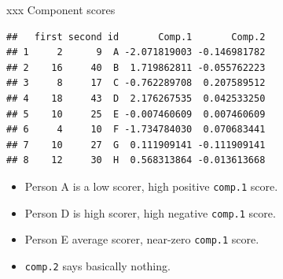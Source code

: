 \documentclass[ignorenonframetext,]{beamer}
\newenvironment{Shaded}{\begin{snugshade}}{\end{snugshade}}
\newcommand{\KeywordTok}[1]{\textcolor[rgb]{0.13,0.29,0.53}{\textbf{#1}}}
\newcommand{\NormalTok}[1]{#1}
\newcommand{\OperatorTok}[1]{\textcolor[rgb]{0.81,0.36,0.00}{\textbf{#1}}}
\newcommand{\StringTok}[1]{\textcolor[rgb]{0.31,0.60,0.02}{#1}}
\begin{document}
\begin{frame}[fragile]{xxx Component scores}
\protect\hypertarget{xxx-component-scores}{}

\begin{Shaded}
\end{Shaded}

\begin{verbatim}
##   first second id       Comp.1       Comp.2
## 1     2      9  A -2.071819003 -0.146981782
## 2    16     40  B  1.719862811 -0.055762223
## 3     8     17  C -0.762289708  0.207589512
## 4    18     43  D  2.176267535  0.042533250
## 5    10     25  E -0.007460609  0.007460609
## 6     4     10  F -1.734784030  0.070683441
## 7    10     27  G  0.111909141 -0.111909141
## 8    12     30  H  0.568313864 -0.013613668
\end{verbatim}

\begin{itemize}
\item
  Person A is a low scorer, high positive \texttt{comp.1} score.
\item
  Person D is high scorer, high negative \texttt{comp.1} score.
\item
  Person E average scorer, near-zero \texttt{comp.1} score.
\item
  \texttt{comp.2} says basically nothing.
\end{itemize}

\end{frame}
\end{document}
